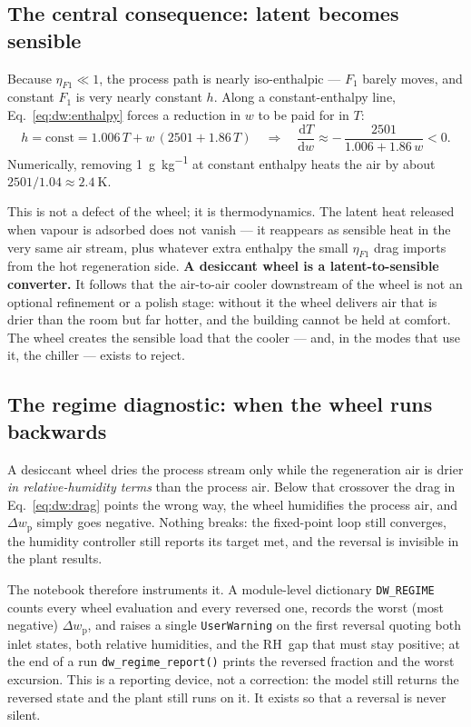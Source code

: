 \documentclass[11pt]{article}
\newcommand{\RH}{\ensuremath{\mathrm{RH}}}
\begin{document}
\subsection{The central consequence: latent becomes sensible}
\label{sec:dw:latent}

Because $\eta_{F1}\ll 1$, the process path is nearly iso-enthalpic --- $F_1$
barely moves, and constant $F_1$ is very nearly constant $h$. Along a
constant-enthalpy line, Eq.~\eqref{eq:dw:enthalpy} forces a reduction in $w$
to be paid for in $T$:
\begin{equation}
h=\text{const}=1.006\,T+w\,(2501+1.86\,T)
\quad\Longrightarrow\quad
\frac{\mathrm{d}T}{\mathrm{d}w}
\approx -\,\frac{2501}{1.006+1.86\,w} < 0 .
\label{eq:dw:latent2sensible}
\end{equation}
Numerically, removing \SI{1}{\gram\per\kilogram} at constant enthalpy heats
the air by about $2501/1.04 \approx \SI{2.4}{\kelvin}$.

This is not a defect of the wheel; it is thermodynamics. The latent heat
released when vapour is adsorbed does not vanish --- it reappears as sensible
heat in the very same air stream, plus whatever extra enthalpy the small
$\eta_{F1}$ drag imports from the hot regeneration side. \textbf{A desiccant
wheel is a latent-to-sensible converter.} It follows that the air-to-air
cooler downstream of the wheel is not an optional refinement or a
polish stage: without it the wheel delivers air that is drier than the room
but far hotter, and the building cannot be held at comfort. The wheel creates
the sensible load that the cooler --- and, in the modes that use it, the
chiller --- exists to reject.

\subsection{The regime diagnostic: when the wheel runs backwards}
\label{sec:dw:regime}

A desiccant wheel dries the process stream only while the regeneration air is
drier \emph{in relative-humidity terms} than the process air. Below that
crossover the drag in Eq.~\eqref{eq:dw:drag} points the wrong way, the wheel
humidifies the process air, and $\Delta w_{\mathrm{p}}$ simply goes negative.
Nothing breaks: the fixed-point loop still converges, the humidity controller
still reports its target met, and the reversal is invisible in the plant
results.

The notebook therefore instruments it. A module-level dictionary
\texttt{DW\_REGIME} counts every wheel evaluation and every reversed one,
records the worst (most negative) $\Delta w_{\mathrm{p}}$, and raises a single
\texttt{UserWarning} on the first reversal quoting both inlet states, both
relative humidities, and the \RH\ gap that must stay positive; at the end of a
run \texttt{dw\_regime\_report()} prints the reversed fraction and the worst
excursion. This is a reporting device, not a correction: the model still
returns the reversed state and the plant still runs on it. It exists so that a
reversal is never silent.
\end{document}
